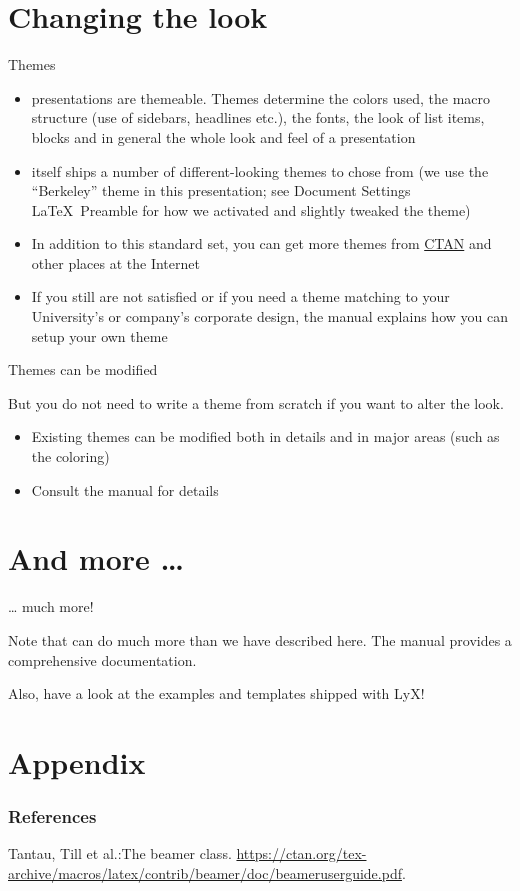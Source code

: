 \documentclass[english]{beamer}
\begin{document}
\section{Changing the look}
\begin{frame}{Themes}
\begin{itemize}
\item {} presentations are themeable. Themes determine
the colors used, the macro structure (use of sidebars, headlines etc.),
the fonts, the look of list items, blocks and in general the whole
look and feel of a presentation
\item {} itself ships a number of different-looking themes
to chose from (we use the ``Berkeley'' theme in this presentation;
see \alert{Document \textrightarrow Settings \textrightarrow LaTeX~Preamble} for
how we activated and slightly tweaked the theme)
\item In addition to this standard set, you can get more themes from \href{http://www.ctan.org}{CTAN}
and other places at the Internet
\item If you still are not satisfied or if you need a theme matching to
your University's or company's corporate design, the 
manual \cite{beamer-ug} explains how you can setup your own theme
\end{itemize}
\end{frame}
%
\begin{frame}{Themes can be modified}

But you do not need to write a theme from scratch if you want to alter
the look.
\begin{itemize}
\item Existing themes can be modified both in details and in major areas
(such as the coloring)
\item Consult the  manual \cite{beamer-ug} for details
\end{itemize}
\end{frame}

\section{And more \ldots}
\begin{frame}{\ldots{} much more!}

Note that  can do much more than we have described
here. The  manual \cite{beamer-ug} provides a
comprehensive documentation.

Also, have a look at the  examples and templates
shipped with LyX!
\end{frame}

\appendix

\section{Appendix}

\begin{frame}

\frametitle<presentation>{References}
\begin{thebibliography}{1}
Tantau, Till et al.:\newblock The beamer class.
\url{https://ctan.org/tex-archive/macros/latex/contrib/beamer/doc/beameruserguide.pdf}.
\end{thebibliography}
\end{frame}
\end{document}

